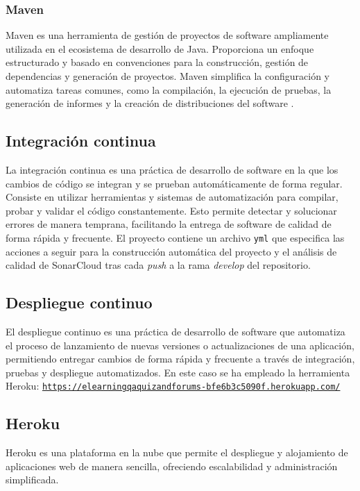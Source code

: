 \subsubsection{Maven}
Maven es una herramienta de gestión de proyectos de software ampliamente utilizada en el ecosistema de desarrollo de Java. Proporciona un enfoque estructurado y basado en convenciones para la construcción, gestión de dependencias y generación de proyectos. Maven simplifica la configuración y automatiza tareas comunes, como la compilación, la ejecución de pruebas, la generación de informes y la creación de distribuciones del software \cite{packt2014}.
\subsection{Integración continua}
La integración continua es una práctica de desarrollo de software en la que los cambios de código se integran y se prueban automáticamente de forma regular. Consiste en utilizar herramientas y sistemas de automatización para compilar, probar y validar el código constantemente. Esto permite detectar y solucionar errores de manera temprana, facilitando la entrega de software de calidad de forma rápida y frecuente. 
El proyecto contiene un archivo \texttt{yml} que especifica las acciones a seguir para la construcción automática del proyecto y el análisis de calidad de SonarCloud tras cada \textit{push} a la rama \textit{develop} del repositorio.
\subsection{Despliegue continuo}
El despliegue continuo es una práctica de desarrollo de software que automatiza el proceso de lanzamiento de nuevas versiones o actualizaciones de una aplicación, permitiendo entregar cambios de forma rápida y frecuente a través de integración, pruebas y despliegue automatizados. En este caso se ha empleado la herramienta Heroku: \texttt{\url{https://elearningqaquizandforums-bfe6b3c5090f.herokuapp.com/}}
\subsection{Heroku}
Heroku es una plataforma en la nube que permite el despliegue y alojamiento de aplicaciones web de manera sencilla, ofreciendo escalabilidad y administración simplificada.
